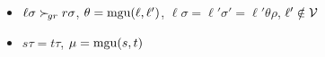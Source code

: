 
\begin{itemize}

    \item
        $\ell\sigma\mathrel\succ_{\!gr} r\sigma$,
        $\theta=\operatorname{mgu}(\ell,\ell')$,
        $\ell\sigma = \ell'\sigma' = \ell'\theta\rho$,
        $\ell'\notin\mathcal{V}$

    \item
        $s\tau = t\tau$,
        $\mu=\operatorname{mgu}(s,t)$
\end{itemize}